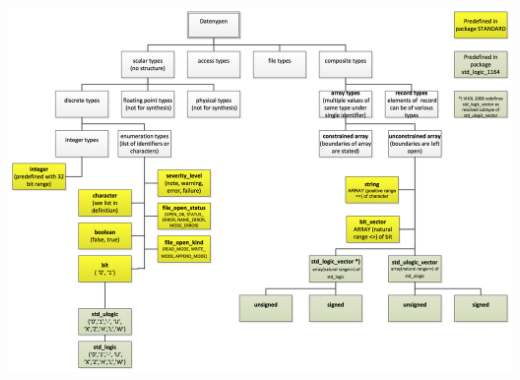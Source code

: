 \begin{minipage}{0.6\textwidth}
	\includegraphics[width=\textwidth]{./bilder/Datentypen}
	

\end{minipage}

